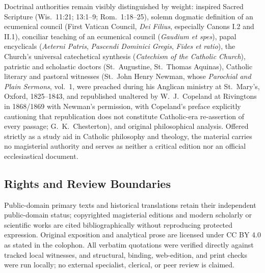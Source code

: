 Doctrinal authorities remain visibly distinguished by weight: inspired Sacred Scripture (Wis.\ 11:21; 13:1--9; Rom.\ 1:18--25), solemn dogmatic definition of an ecumenical council (First Vatican Council, \emph{Dei Filius}, especially Canons I.2 and II.1), conciliar teaching of an ecumenical council (\emph{Gaudium et spes}), papal encyclicals (\emph{Aeterni Patris}, \emph{Pascendi Dominici Gregis}, \emph{Fides et ratio}), the Church's universal catechetical synthesis (\emph{Catechism of the Catholic Church}), patristic and scholastic doctors (St.\ Augustine, St.\ Thomas Aquinas), Catholic literary and pastoral witnesses (St.\ John Henry Newman, whose \emph{Parochial and Plain Sermons}, vol.\ 1, were preached during his Anglican ministry at St.\ Mary's, Oxford, 1825--1843, and republished unaltered by W.\ J.\ Copeland at Rivingtons in 1868/1869 with Newman's permission, with Copeland's preface explicitly cautioning that republication does not constitute Catholic-era re-assertion of every passage; G.\ K.\ Chesterton), and original philosophical analysis. Offered strictly as a study aid in Catholic philosophy and theology, the material carries no magisterial authority and serves as neither a critical edition nor an official ecclesiastical document.

\subsection*{Rights and Review Boundaries}

Public-domain primary texts and historical translations retain their independent public-domain status; copyrighted magisterial editions and modern scholarly or scientific works are cited bibliographically without reproducing protected expression. Original exposition and analytical prose are licensed under CC BY 4.0 as stated in the colophon. All verbatim quotations were verified directly against tracked local witnesses, and structural, binding, web-edition, and print checks were run locally; no external specialist, clerical, or peer review is claimed.
